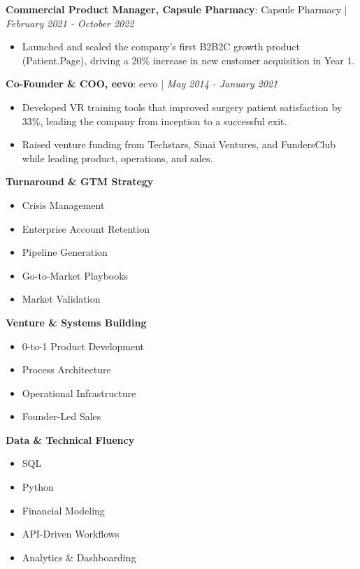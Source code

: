\documentclass[10pt,a4paper,withhyper]{altacv}
\newcommand{\atscvevent}[4]{%
  \textbf{#1}: #2 | \textit{#3}%
  \vspace{0.3em}%
}
\begin{document}
\atscvevent{Commercial Product Manager, Capsule Pharmacy}{Capsule Pharmacy}{February 2021 - October 2022}{}

\begin{itemize}
\item Launched and scaled the company's first B2B2C growth product (Patient.Page), driving a 20\% increase in new customer acquisition in Year 1.
\end{itemize}

\atscvevent{Co-Founder \& COO, eevo}{eevo}{May 2014 - January 2021}{}

\begin{itemize}
\item Developed VR training tools that improved surgery patient satisfaction by 33\%, leading the company from inception to a successful exit.
\item Raised venture funding from Techstars, Sinai Ventures, and FundersClub while leading product, operations, and sales.
\end{itemize}






\textbf{Turnaround \& GTM Strategy}
\begin{itemize}
\item Crisis Management
\item Enterprise Account Retention
\item Pipeline Generation
\item Go-to-Market Playbooks
\item Market Validation
\end{itemize}

\textbf{Venture \& Systems Building}
\begin{itemize}
\item 0-to-1 Product Development
\item Process Architecture
\item Operational Infrastructure
\item Founder-Led Sales
\end{itemize}

\textbf{Data \& Technical Fluency}
\begin{itemize}
\item SQL
\item Python
\item Financial Modeling
\item API-Driven Workflows
\item Analytics \& Dashboarding
\end{itemize}
\end{document}
